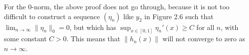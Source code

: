 \documentclass[a4paper]{article}
\begin{document}
For the 0-norm, the above proof does not go through, because it is not too difficult
to construct a sequence $(\eta_{n})$ like $y_{2}$ in Figure 2.6 such that
$\lim_{n \to \infty} \|\eta_{n}\|_{0} = 0$, but which has
$\sup_{x \in [0,1]} \eta_{n}'(x) \geq C$ for all $n$, with some constant
$C > 0$.
This means that $\|h_{n}(x)\|$ will not converge to zero as $n \to \infty$.
\end{document}

